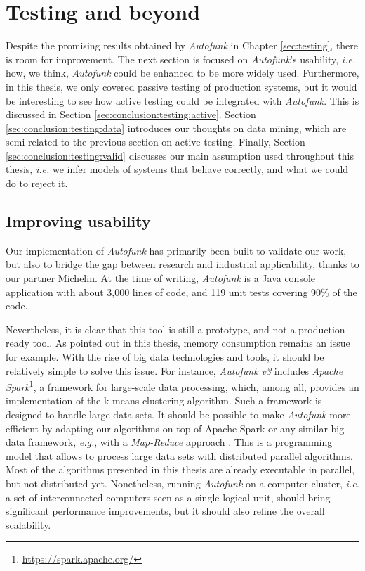 \section{Testing and beyond}
\label{sec:conclusion:testing}

Despite the promising results obtained by \textit{Autofunk} in
Chapter \ref{sec:testing}, there is room for improvement. The
next section is focused on \textit{Autofunk}'s usability, \emph{i.e.}
how, we think, \textit{Autofunk} could be enhanced to be more
widely used. Furthermore, in this thesis, we only covered passive
testing of production systems, but it would be interesting to see
how active testing could be integrated with \textit{Autofunk}.
This is discussed in Section \ref{sec:conclusion:testing:active}.
Section \ref{sec:conclusion:testing:data} introduces our thoughts
on data mining, which are semi-related to the previous section on
active testing. Finally, Section
\ref{sec:conclusion:testing:valid} discusses our main assumption
used throughout this thesis, \emph{i.e.} we infer models of
systems that behave correctly, and what we could do to reject it.


\subsection{Improving usability}

Our implementation of \textit{Autofunk} has primarily been built
to validate our work, but also to bridge the gap between research
and industrial applicability, thanks to our partner Michelin. At
the time of writing, \emph{Autofunk} is a Java console
application with about 3,000 lines of code, and 119 unit tests
covering 90\% of the code.

Nevertheless, it is clear that this tool is still a prototype,
and not a production-ready tool. As pointed out in this thesis,
memory consumption remains an issue for example. With the rise of
big data technologies and tools, it should be relatively simple
to solve this issue. For instance, \emph{Autofunk v3} includes
\emph{Apache Spark}\footnote{\url{https://spark.apache.org/}}, a
framework for large-scale data processing, which, among all,
provides an implementation of the k-means clustering algorithm.
Such a framework is designed to handle large data sets. It should
be possible to make \emph{Autofunk} more efficient by adapting
our algorithms on-top of Apache Spark or any similar big data
framework, \emph{e.g.}, with a \emph{Map-Reduce} approach
\cite{dean2008mapreduce}. This is a programming model that allows
to process large data sets with distributed parallel algorithms.
Most of the algorithms presented in this thesis are already
executable in parallel, but not distributed yet. Nonetheless,
running \emph{Autofunk} on a computer cluster, \emph{i.e.} a set
of interconnected computers seen as a single logical unit, should
bring significant performance improvements, but it should also
refine the overall scalability.

